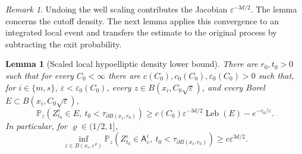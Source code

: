 \documentclass[11pt]{article}
\numberwithin{equation}{section}
\theoremstyle{plain}
\newtheorem{lemma}[theorem]{Lemma}
\theoremstyle{definition}
\theoremstyle{remark}
\newtheorem{remark}[theorem]{Remark}
\newcommand{\eps}{\varepsilon}
\newcommand{\Pbb}{\mathbb P}
\begin{document}
\begin{remark}
Undoing the well scaling contributes the Jacobian $\eps^{-3d/2}$.  The lemma
concerns the cutoff density.  The next lemma applies this convergence to an
integrated local event and transfers the estimate to the original process by
subtracting the exit probability.
\end{remark}

\begin{lemma}[Scaled local hypoelliptic density lower bound]
\label{lem:scaled-local-density-lower-bound}
There are $r_0,t_0>0$ such that for every $C_0<\infty$ there are
$c(C_0),c_0(C_0),\eps_0(C_0)>0$ such that, for $i\in\{m,s\}$,
$\eps<\eps_0(C_0)$, every $z\in B(x_i,C_0\sqrt\eps)$, and every Borel
$E\subset B(x_i,C_0\sqrt\eps)$,
\begin{equation}
\label{eq:scaled-local-minorization}
\Pbb_z\left(Z_{t_0}^\eps\in E,\ t_0<\tau_{\partial B(x_i,r_0)}\right)
\ge c(C_0)\eps^{-3d/2}\operatorname{Leb}(E)-e^{-c_0/\eps}.
\end{equation}
In particular, for $\varrho\in(1/2,1]$,
\[
\inf_{z\in B(x_i,\eps^\varrho)}
\Pbb_z\left(
Z_{t_0}^\eps\in\mathsf A_\eps^i,
\ t_0<\tau_{\partial B(x_i,r_0)}
\right)
\ge c\eps^{3d/2}.
\]
\end{lemma}
\end{document}
